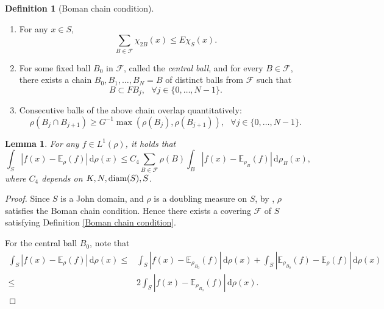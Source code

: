 \documentclass[a4paper,11pt]{article}
\numberwithin{equation}{section}
\theoremstyle{plain}
\newtheorem{lemma}[theorem]{Lemma}
\theoremstyle{definition}
\newtheorem{definition}[theorem]{Definition}
\theoremstyle{remark}
\newcommand{\E}{\mathbb{E}}
\newcommand{\diam}{\mathop{\rm diam}\nolimits}
\renewcommand{\d}{{\mathrm d}}
\begin{document}
\begin{appendices}
\begin{definition}[Boman chain condition]
		\begin{enumerate}
				\item For any \(x \in S\),
				\begin{equation*}
						\sum_{B \in \mathcal{F}} \chi_{2B}(x) \leq E \chi_{S}(x).
					\end{equation*}
				\item For some fixed ball \(B_0\) in \(\mathcal{F}\), called the \emph{central ball}, and for every \(B \in \mathcal{F}\), there exists a chain \(B_0, B_1, \ldots, B_N = B\) of distinct balls from \(\mathcal{F}\) such that
				\begin{equation*}
					B \subset F B_j,~~~\forall j \in \{0, \ldots, N-1\}.
					\end{equation*}
			\item Consecutive balls of the above chain overlap quantitatively:
				\begin{equation*}
						\rho(B_j \cap B_{j+1}) \geq G^{-1} \max(\rho(B_j), \rho(B_{j+1})),~~~\forall j \in \{0, \ldots, N-1\}.
					\end{equation*}
			\end{enumerate}
	\end{definition}
	
	\begin{lemma}\label{3.1}
	For any $f\in L^1(\rho)$,   it holds that
	\begin{equation}\label{A.5}
		\int_S |f(x)-\E_{\rho}(f)|\,\d\rho(x)\leq C_4 \sum_{B\in\mathcal{F}}\rho(B)\int_B |f(x)-\E_{\rho_B}(f)|\,\d\rho_B(x),
	\end{equation}
	where $C_4$ depends on $K,N,\diam(S),S$.
	\end{lemma}
	
    \begin{proof} 
    	Since $S$ is a John domain, and $\rho$ is a doubling measure on $S$, by  \cite[Proposition 3.7]{arXiv:2504.05412}, $\rho$ satisfies the Boman chain condition. Hence there exists a covering $\mathcal{F}$ of $S$ satisfying Definition \ref{Boman chain condition}.
    	
    	For the central ball $B_0$, note that
    	\begin{equation}\label{A.2}
    		\begin{aligned}
    			\int_S |f(x)-\E_{\rho}(f)|\,\d\rho(x)
    			\leq & \int_S |f(x)-\E_{\rho_{B_0}}(f)|\,\d\rho(x)+\int_S |\E_{\rho_{B_0}}(f)-\E_{\rho}(f)|\,\d\rho(x)\\
    			\leq & 2\int_S |f(x)-\E_{\rho_{B_0}}(f)|\,\d\rho(x).
    		\end{aligned}
    	\end{equation}
    	

\end{proof}
\end{appendices}
\end{document}
